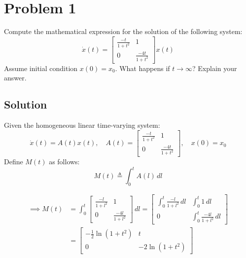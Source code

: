 \section*{Problem 1}

Compute the mathematical expression for the solution of the following system:
\begin{equation*}
    \dot x(t)
    =
    \begin{bmatrix}
        \frac{-t}{1+t^2} & 1                 \\
        0                & \frac{-4t}{1+t^2}
    \end{bmatrix}
    x(t)
\end{equation*}
Assume initial condition \( x(0) = x_0 \).
What happens if \( t \rightarrow \infty \)?
Explain your answer.

\subsection*{Solution}

Given the homogeneous linear time-varying system:
\begin{equation*}
    \dot{x}(t)
    =
    A(t) x(t),
    \quad
    A(t)
    =
    \begin{bmatrix}
        \frac{-t}{1+t^2} & 1                 \\
        0                & \frac{-4t}{1+t^2}
    \end{bmatrix},
    \quad
    x(0) = x_0
\end{equation*}
Define \( M(t) \) as follows:
\begin{equation*}
    M(t)
    \triangleq
    \int_{0}^{t} A(l) \, dl
\end{equation*}

\begin{align*}
    \implies
    M(t)
     & =
    \int_{0}^{t}
    \begin{bmatrix}
        \frac{-l}{1+l^2} & 1                 \\
        0                & \frac{-4l}{1+l^2}
    \end{bmatrix}
    \, dl
    =
    \begin{bmatrix}
        \int_{0}^{t} \frac{-l}{1+l^2} \, dl
         &
        \int_{0}^{t} 1 \, dl
        \\
        0
         &
        \int_{0}^{t} \frac{-4l}{1+l^2} \, dl
    \end{bmatrix}
    \\ & =
    \begin{bmatrix}
        -\frac{1}{2} \ln(1+t^2)
         &
        t
        \\
        0
         &
        -2 \ln(1+t^2)
    \end{bmatrix}
\end{align*}

